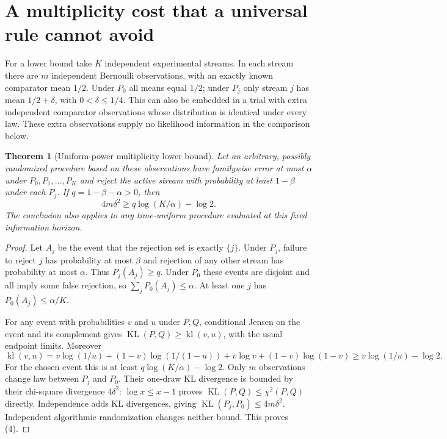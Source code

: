 \documentclass[11pt]{article}
\newtheorem{theorem}{Theorem}
\theoremstyle{remark}
\newcommand{\KL}{\operatorname{KL}}
\begin{document}
\section{A multiplicity cost that a universal rule cannot avoid}
For a lower bound take $K$ independent experimental streams. In each stream
there are $m$ independent Bernoulli observations, with an exactly known
comparator mean $1/2$. Under $P_0$ all means equal $1/2$; under $P_j$ only
stream $j$ has mean $1/2+\delta$, with $0<\delta\leq1/4$. This can also
be embedded in a trial with extra independent comparator observations
whose distribution is identical under every law. These extra observations
supply no likelihood information in the comparison below.

\begin{theorem}[Uniform-power multiplicity lower bound]
Let an arbitrary, possibly randomized procedure based on these observations
have familywise error at most $\alpha$ under $P_0,P_1,\ldots,P_K$ and
reject the active stream with probability at least $1-\beta$ under each
$P_j$. If $q=1-\beta-\alpha>0$, then
\[
 4m\delta^2\geq q\log(K/\alpha)-\log2. \tag{4}
\]
The conclusion also applies to any time-uniform procedure evaluated at this
fixed information horizon.
\end{theorem}
\begin{proof}
Let $A_j$ be the event that the rejection set is exactly $\{j\}$.
Under $P_j$, failure to reject $j$ has probability at most $\beta$ and
rejection of any other stream has probability at most $\alpha$.
Thus $P_j(A_j)\geq q$. Under $P_0$ these events are disjoint and all
imply some false rejection, so $\sum_jP_0(A_j)\leq\alpha$.
At least one $j$ has $P_0(A_j)\leq\alpha/K$.

For any event with probabilities $v$ and $u$ under $P,Q$, conditional
Jensen on the event and its complement gives
$\KL(P,Q)\geq\operatorname{kl}(v,u)$, with the usual endpoint limits.
Moreover
\[
 \operatorname{kl}(v,u)
 =v\log(1/u)+(1-v)\log(1/(1-u))
   +v\log v+(1-v)\log(1-v)
 \geq v\log(1/u)-\log2.
\]
For the chosen event this is at least $q\log(K/\alpha)-\log2$.
Only $m$ observations change law between $P_j$ and $P_0$. Their one-draw
KL divergence is bounded by their chi-square divergence $4\delta^2$:
$\log x\leq x-1$ proves $\KL(P,Q)\leq\chi^2(P,Q)$ directly.
Independence adds KL divergences, giving $\KL(P_j,P_0)\leq4m\delta^2$.
Independent algorithmic randomization changes neither bound. This proves (4).
\end{proof}
\end{document}
